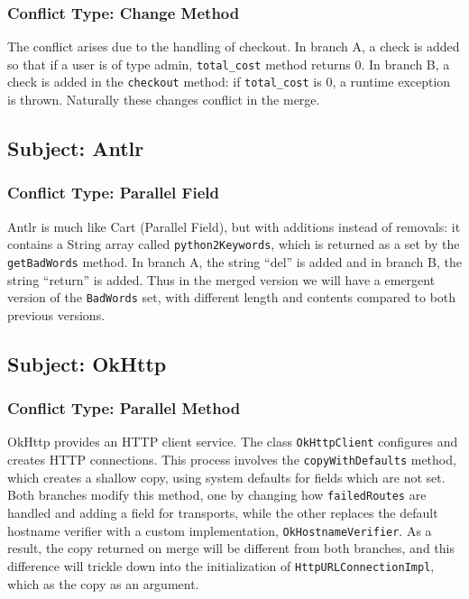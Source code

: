 \subsubsection{Conflict Type: Change Method}

The conflict arises due to the handling of checkout. In branch A, a check is added so that if a user is of type admin,
\texttt{total\_cost} method returns 0. In branch B, a check is added in the \texttt{checkout} method: if \texttt{total\_cost} is 0, a runtime exception is thrown.
Naturally these changes conflict in the merge.

\subsection{Subject: Antlr}

\subsubsection{Conflict Type: Parallel Field}

Antlr is much like Cart (Parallel Field), but with additions instead of removals: it contains a String array called \texttt{python2Keywords}, which is returned as a set by the \texttt{getBadWords} method.
In branch A, the string ``del'' is added and in branch B, the string ``return'' is added.
Thus in the merged version we will have a emergent version of the \texttt{BadWords}
set, with different length and contents compared to both previous versions.

\subsection{Subject: OkHttp}

\subsubsection{Conflict Type: Parallel Method}

OkHttp provides an HTTP client service. The class \texttt{OkHttpClient} configures and creates HTTP connections. This process involves
the \texttt{copyWithDefaults} method, which creates a shallow copy, using system defaults for fields which are not set. Both branches
modify this method, one by changing how \texttt{failedRoutes} are handled and adding a field for transports, while the other replaces
the default hostname verifier with a custom implementation, \texttt{OkHostnameVerifier}. As a result, the copy returned on merge will
be different from both branches, and this difference will trickle down into the initialization of \texttt{HttpURLConnectionImpl}, which
as the copy as an argument.

